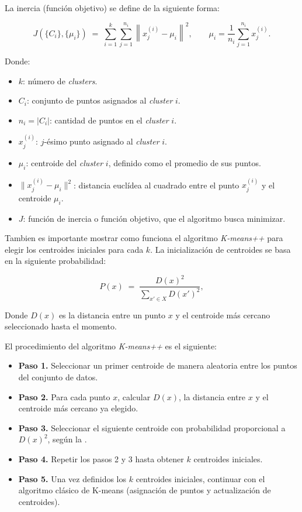 \documentclass[12pt,a4paper]{article}
\begin{document}
La inercia (función objetivo) se define de la siguiente forma:

\begin{equation}
  J(\{C_i\}, \{\mu_i\}) \;=\; 
  \sum_{i=1}^{k} \sum_{j=1}^{n_i} \left\| x_j^{(i)} - \mu_i \right\|^2,
  \qquad
  \mu_i = \frac{1}{n_i} \sum_{j=1}^{n_i} x_j^{(i)}.
  \label{eq:kmeans_objetivo}
\end{equation}

Donde:
\begin{itemize}
  \item $k$: número de \textit{clusters}.
  \item $C_i$: conjunto de puntos asignados al \textit{cluster} $i$.
  \item $n_i = |C_i|$: cantidad de puntos en el \textit{cluster} $i$.
  \item $x_j^{(i)}$: $j$-ésimo punto asignado al \textit{cluster} $i$.
  \item $\mu_i$: centroide del \textit{cluster} $i$, definido como el promedio de sus puntos.
  \item $\|x_j^{(i)} - \mu_i\|^2$: distancia euclídea al cuadrado entre el punto $x_j^{(i)}$ y el centroide $\mu_i$.
  \item $J$: función de inercia o función objetivo, que el algoritmo busca minimizar.
\end{itemize}

Tambien es importante mostrar como funciona el algoritmo \textit{K-means++} para elegir los centroides iniciales para cada $k$.
La inicialización de centroides se basa en la siguiente probabilidad:

\begin{equation}
  P(x) \;=\; \frac{D(x)^2}{\sum_{x' \in X} D(x')^2},
  \label{eq:kmeanspp_prob}
\end{equation}

Donde $D(x)$ es la distancia entre un punto $x$ y el centroide más cercano seleccionado hasta el momento.

El procedimiento del algoritmo \textit{K-means++} es el siguiente:

\begin{itemize}
  \item \textbf{Paso 1.} Seleccionar un primer centroide de manera aleatoria entre los puntos del conjunto de datos.
  \item \textbf{Paso 2.} Para cada punto $x$, calcular $D(x)$, la distancia entre $x$ y el centroide más cercano ya elegido.
  \item \textbf{Paso 3.} Seleccionar el siguiente centroide con probabilidad proporcional a $D(x)^2$, según la .
  \item \textbf{Paso 4.} Repetir los pasos 2 y 3 hasta obtener $k$ centroides iniciales.
  \item \textbf{Paso 5.} Una vez definidos los $k$ centroides iniciales, continuar con el algoritmo clásico de K-means (asignación de puntos y actualización de centroides).
\end{itemize}
\end{document}
